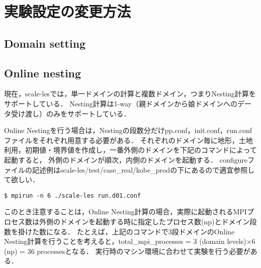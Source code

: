 \section{実験設定の変更方法}
\subsection{Domain setting}

\subsection{Online nesting}

現在，scale-lesでは，単一ドメインの計算と複数ドメイン，つまりNesting計算をサポートしている．
Nesting計算は1-way（親ドメインから娘ドメインへのデータ受け渡し）のみをサポートしている．

Online Nestingを行う場合は，Nestingの段数分だけpp.conf，init.conf，run.confファイルをそれぞれ用意する必要がある．
それぞれのドメイン毎に地形，土地利用，初期値・境界値を作成し，一番外側のドメインを下記のコマンドによって起動すると，
外側のドメインが順次，内側のドメインを起動する．
configureファイルの記述例はscale-les/test/case\_real/kobe\_prodの下にあるので適宜参照して欲しい．
\begin{verbatim}
$ mpirun -n 6 ./scale-les run.d01.conf
\end{verbatim}
このとき注意することは，Online Nesting計算の場合，実際に起動されるMPIプロセス数は外側のドメインを起動する時に指定したプロセス数(np)とドメイン段数を掛けた数になる．
たとえば，上記のコマンドで3段ドメインのOnline Nesting計算を行うことを考えると，total\_mpi\_processes = 3 (domain levels)×6 (np) = 36 processesとなる．
実行時のマシン環境に合わせて実験を行う必要がある．

